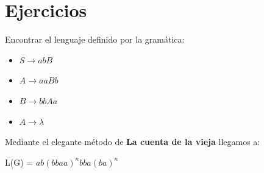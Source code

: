 \section{Ejercicios}

\begin{problem}
Encontrar el lenguaje definido por la gramática:
\begin{itemize}
\item $S \rightarrow abB$
\item $A \rightarrow aaBb$
\item $B \rightarrow bbAa$
\item $A \rightarrow \lambda$
\end{itemize}
\solution
Mediante el elegante método de \textbf{La cuenta de la vieja} llegamos a:

 L(G) = $ab(bbaa)^nbba(ba)^n$
\end{problem}

